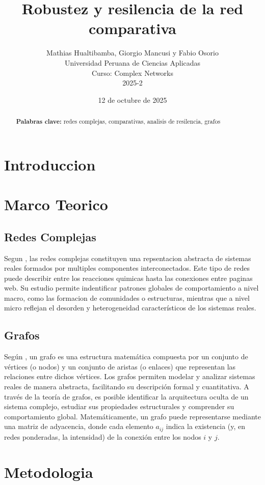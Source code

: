 \documentclass[twocolumn]{article}
\title{Robustez y resilencia de la red comparativa}
\author{
    Mathias Hualtibamba, Giorgio Mancusi y Fabio Osorio \\
    Universidad Peruana de Ciencias Aplicadas \\
    Curso: Complex Networks \\
    2025-2 
}
\date{12 de octubre de 2025}
\newcommand{\keywords}[1]{\par\noindent\textbf{Palabras clave:} #1}
\begin{document}
\maketitle

\begin{abstract}
\blindtext[1]
\keywords{redes complejas, comparativas, analisis de resilencia, grafos}
\end{abstract}

\section{Introduccion}
\blindtext[2]

\section{Marco Teorico}
\subsection{Redes Complejas}
Segun \cite{ding2025comprehensivesurveyartificialintelligence}, las redes complejas constituyen una repsentacion abstracta de sistemas reales formados por multiples componentes interconectados. 
Este tipo de redes puede describir entre los reacciones quimicas hasta las conexiones entre paginas web. Su estudio permite indentificar patrones globales de comportamiento a nivel macro, como las formacion de comunidades o estructuras, mientras que a nivel micro reflejan el desorden y heterogeneidad característicos de los sistemas reales.

\subsection{Grafos}
Según \textcite{Zamora_L_pez_2024}, un grafo es una estructura matemática compuesta por un conjunto de vértices (o nodos) y un conjunto de aristas (o enlaces) que representan las relaciones entre dichos vértices. 
Los grafos permiten modelar y analizar sistemas reales de manera abstracta, facilitando su descripción formal y cuantitativa. 
A través de la teoría de grafos, es posible identificar la arquitectura oculta de un sistema complejo, estudiar sus propiedades estructurales y comprender su comportamiento global. 
Matemáticamente, un grafo puede representarse mediante una matriz de adyacencia, donde cada elemento $a_{ij}$ indica la existencia (y, en redes ponderadas, la intensidad) de la conexión entre los nodos $i$ y $j$.

\section{Metodologia}
\end{document}
